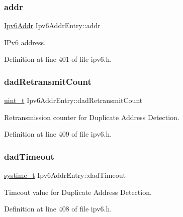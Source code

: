 \subsubsection{\texorpdfstring{addr}{addr}}
{\footnotesize\ttfamily \hyperlink{ipv6_8h_aed0cbc40c61ed5b4fb681ebc55237e89}{Ipv6\+Addr} Ipv6\+Addr\+Entry\+::addr}



I\+Pv6 address. 



Definition at line 401 of file ipv6.\+h.

\mbox{\label{structIpv6AddrEntry_ade9430db97130475d7b1ea5f9b1880e0}} 
\subsubsection{\texorpdfstring{dad\+Retransmit\+Count}{dadRetransmitCount}}
{\footnotesize\ttfamily \hyperlink{compiler__port_8h_a12a1e9b3ce141648783a82445d02b58d}{uint\+\_\+t} Ipv6\+Addr\+Entry\+::dad\+Retransmit\+Count}



Retransmission counter for Duplicate Address Detection. 



Definition at line 409 of file ipv6.\+h.

\mbox{\label{structIpv6AddrEntry_ae1f2402bd716fae570c797064da15807}} 
\subsubsection{\texorpdfstring{dad\+Timeout}{dadTimeout}}
{\footnotesize\ttfamily \hyperlink{compiler__port_8h_ae3e32a98d431a02106616da3071832dd}{systime\+\_\+t} Ipv6\+Addr\+Entry\+::dad\+Timeout}



Timeout value for Duplicate Address Detection. 



Definition at line 408 of file ipv6.\+h.

\mbox{\label{structIpv6AddrEntry_aebcce0d3eff51b7c413e43ec5bf86282}} 

